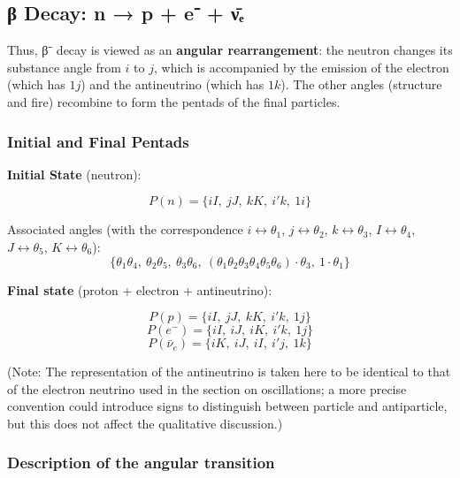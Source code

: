 \documentclass[11pt]{article}
\begin{document}
\hypertarget{ux3b2-decay-n-p-e-ux3bdux2091}{%
\subsection{β Decay: n → p + e⁻ +
ν̄ₑ}\label{ux3b2-decay-n-p-e-ux3bdux2091}}

Thus, β⁻ decay is viewed as an \textbf{angular rearrangement}: the
neutron changes its substance angle from \(i\) to \(j\), which is
accompanied by the emission of the electron (which has \(1j\)) and the
antineutrino (which has \(1k\)). The other angles (structure and fire)
recombine to form the pentads of the final particles.

\hypertarget{initial-and-final-pentads}{%
\subsubsection{Initial and Final
Pentads}\label{initial-and-final-pentads}}

\textbf{Initial State} (neutron):

\[
P(n) = \{ iI,\ jJ,\ kK,\ i'k,\ 1i \}
\]

Associated angles (with the correspondence
\(i \leftrightarrow \theta_1\), \(j \leftrightarrow \theta_2\),
\(k \leftrightarrow \theta_3\), \(I \leftrightarrow \theta_4\),
\(J \leftrightarrow \theta_5\), \(K \leftrightarrow \theta_6\)): \[
\{\theta_1\theta_4,\ \theta_2\theta_5,\ \theta_3\theta_6,\ (\theta_1\theta_2\theta_3\theta_4\theta_5\theta_6)\cdot\theta_3,\ 1\cdot\theta_1\}
\]

\textbf{Final state} (proton + electron + antineutrino):

\[
P(p) = \{ iI,\ jJ,\ kK,\ i'k,\ 1j \}
\] \[
P(e^-) = \{ iI,\ iJ,\ iK,\ i'k,\ 1j \}
\] \[
P(\bar{\nu}_e) = \{ iK,\ iJ,\ iI,\ i'j,\ 1k \}
\]

(Note: The representation of the antineutrino is taken here to be
identical to that of the electron neutrino used in the section on
oscillations; a more precise convention could introduce signs to
distinguish between particle and antiparticle, but this does not affect
the qualitative discussion.)

\hypertarget{description-of-the-angular-transition}{%
\subsubsection{Description of the angular
transition}\label{description-of-the-angular-transition}}
\end{document}
